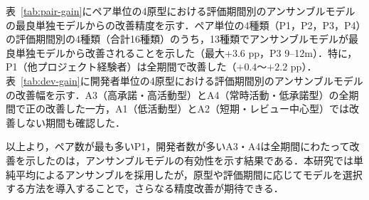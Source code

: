 \documentclass[submit,noauthor,ses,dvipdfmx]{ipsj}
\newcommand{\todo}[1]{\colorbox{yellow}{{\bf TODO}:}{\color{red} {\textbf{[#1]}}}}
\begin{document}
表~\ref{tab:pair-gain}にペア単位の4原型における評価期間別のアンサンブルモデルの最良単独モデルからの改善精度を示す．ペア単位の4種類（P1，P2，P3，P4）の評価期間別の4種類（合計16種類）のうち，13種類でアンサンブルモデルが最良単独モデルから改善されることを示した（最大$+3.6$ pp，P3 9--12m）．特に，P1（他プロジェクト経験者）は全期間で改善した（$+0.4$〜$+2.2$ pp）．表~\ref{tab:dev-gain}に開発者単位の4原型における評価期間別のアンサンブルモデルの改善幅を示す．A3（高承諾・高活動型）とA4（常時活動・低承諾型）の全期間で正の改善した一方，A1（低活動型）とA2（短期・レビュー中心型）では改善しない期間も確認した．

以上より，ペア数が最も多いP1，開発者数が多いA3・A4は全期間にわたって改善を示したのは，アンサンブルモデルの有効性を示す結果である．本研究では単純平均によるアンサンブルを採用したが，原型や評価期間に応じてモデルを選択する方法を導入することで，さらなる精度改善が期待できる．


\end{document}
